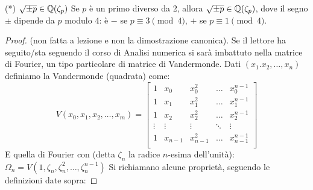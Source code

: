 \begin{theorem}{(*) $\sqrt{\pm p} \in \mathbb{Q}(\zeta_p)$}
    Se $p$ è un primo diverso da 2, allora $\sqrt{\pm p} \in \mathbb{Q}(\zeta_p)$, dove il segno $\pm$ dipende da $p$ modulo 4: è $-$ se $p \equiv 3 \pmod{4}$, $+$ se $p \equiv 1 \pmod{4}$.
\end{theorem}
\begin{proof}
    (non fatta a lezione e non la dimostrazione canonica). Se il lettore ha seguito/sta seguendo il corso di Analisi numerica si sarà imbattuto nella matrice di Fourier, un tipo particolare di matrice di Vandermonde. Dati $(x_1. x_2, \dots, x_n)$ definiamo la Vandermonde (quadrata) come:
\begin{equation*}
V(x_0, x_1, x_2, \dots, x_m) = 
\begin{bmatrix}
1 & x_0 & x_0^2 & \dots & x_0^{n-1}\\
1 & x_1 & x_1^2 & \dots & x_1^{n-1}\\
1 & x_2 & x_2^2 & \dots & x_2^{n-1}\\
\vdots & \vdots & \vdots & \ddots & \vdots \\ 
1 & x_{n-1} & x_{n-1}^2 & \dots & x_{n-1}^{n-1}\\
\end{bmatrix}
\end{equation*}
E quella di Fourier con (detta $\zeta_n$ la radice $n$-esima dell'unità): $\Omega_n = V(1,\zeta_n,\zeta_n^2,\dots, \zeta_n^{n-1})$
Si richiamano alcune proprietà, seguendo le definizioni date sopra:
\end{proof}
